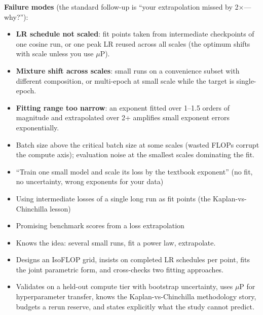 \begin{interviewq}
\textbf{Failure modes} (the standard follow-up is ``your extrapolation missed by 2$\times$---why?''):
\begin{itemize}
    \item \textbf{LR schedule not scaled}: fit points taken from intermediate checkpoints of one cosine run, or one peak LR reused across all scales (the optimum shifts with scale unless you use $\mu$P).
    \item \textbf{Mixture shift across scales}: small runs on a convenience subset with different composition, or multi-epoch at small scale while the target is single-epoch.
    \item \textbf{Fitting range too narrow}: an exponent fitted over 1--1.5 orders of magnitude and extrapolated over 2+ amplifies small exponent errors exponentially.
    \item Batch size above the critical batch size at some scales (wasted FLOPs corrupt the compute axis); evaluation noise at the smallest scales dominating the fit.
\end{itemize}

\redflags
\begin{itemize}
    \item ``Train one small model and scale its loss by the textbook exponent'' (no fit, no uncertainty, wrong exponents for your data)
    \item Using intermediate losses of a single long run as fit points (the Kaplan-vs-Chinchilla lesson)
    \item Promising benchmark scores from a loss extrapolation
\end{itemize}


\goodgreat
\begin{itemize}
    \item {} Knows the idea: several small runs, fit a power law, extrapolate.
    \item {} Designs an IsoFLOP grid, insists on completed LR schedules per point, fits the joint parametric form, and cross-checks two fitting approaches.
    \item {} Validates on a held-out compute tier with bootstrap uncertainty, uses $\mu$P for hyperparameter transfer, knows the Kaplan-vs-Chinchilla methodology story, budgets a rerun reserve, and states explicitly what the study cannot predict.
\end{itemize}

\end{interviewq}


